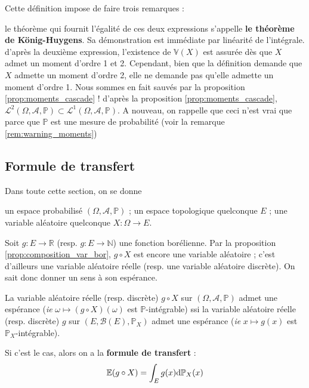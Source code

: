 \documentclass[../integ-proba.tex]{subfiles}
\begin{document}
\begin{rem}
    Cette définition impose de faire trois remarques :
    \begin{itemize}
        \itemb le théorème qui fournit l'égalité de ces deux expressions s'appelle \textbf{le théorème de König-Huygens}. Sa démonstration est immédiate par linéarité de l'intégrale.
        \itemb d'après la deuxième expression, l'existence de $\mathbb{V}(X)$ est assurée dès que $X$ admet un moment d'ordre 1 et 2.
        Cependant, bien que la définition demande que $X$ admette un moment d'ordre 2, elle ne demande pas qu'elle admette un moment d'ordre 1.
        Nous sommes en fait sauvés par la proposition \ref{prop:moments_cascade} !
        \itemb d'après la proposition \ref{prop:moments_cascade}, $\mathcal{L}^2\left(\Omega, \mathcal{A}, \mathbb{P}\right) \subset \mathcal{L}^1\left(\Omega, \mathcal{A}, \mathbb{P}\right)$.
        A nouveau, on rappelle que ceci n'est vrai que parce que $\mathbb{P}$ est une mesure de probabilité (voir la remarque \ref{rem:warning_moments})
    \end{itemize}
\end{rem}

\subsection{Formule de transfert}

Dans toute cette section, on se donne
\begin{itemize}
    \itemb un espace probabilisé $\left(\Omega, \mathcal{A}, \mathbb{P}\right)$ ;
    \itemb un espace topologique quelconque $E$ ;
    \itemb une variable aléatoire quelconque $X:\Omega \longrightarrow E$.
\end{itemize}

\begin{thm}
    Soit $g:E \longrightarrow \mathbb{R}$ (resp. $g:E \longrightarrow \mathbb{N}$) une fonction borélienne.
    Par la proposition \ref{prop:composition_var_bor}, $g \circ X$ est encore une variable aléatoire ; c'est d'ailleurs une variable aléatoire réelle (resp. une variable aléatoire discrète).
    On sait donc donner un sens à son espérance.

    La variable aléatoire réelle (resp. discrète) $g \circ X$ sur $\left(\Omega, \mathcal{A}, \mathbb{P}\right)$ admet une espérance (\textit{ie} $\omega \mapsto (g \circ X)(\omega)$ est $\mathbb{P}$-intégrable) ssi la variable aléatoire réelle (resp. discrète) $g$ sur $\left(E, \mathcal{B}(E), \mathbb{P}_X\right)$ admet une espérance (\textit{ie} $x \mapsto g(x)$ est $\mathbb{P}_X$-intégrable).
    
    Si c'est le cas, alors on a la \textbf{formule de transfert} :
    $$
    \mathbb{E}(g \circ X) = \int_E g(x)\textnormal{d}\mathbb{P}_X(x)
    $$
\end{thm}
\end{document}
